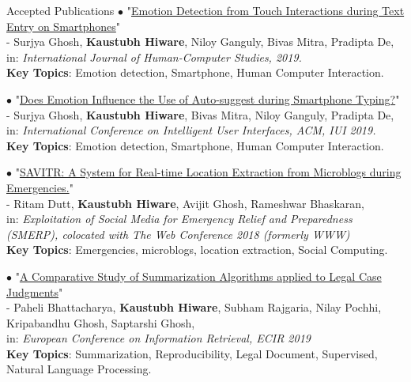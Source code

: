 \documentclass{resume} %
\begin{document}
\begin{rSection}{Accepted Publications}
$\bullet$ "\href{https://www.sciencedirect.com/science/article/abs/pii/S1071581918304889}{Emotion Detection from Touch Interactions during Text Entry on Smartphones}" \\
- Surjya Ghosh, \textbf{Kaustubh Hiware}, Niloy Ganguly, Bivas Mitra, Pradipta De,\\
in: \textit{International Journal of Human-Computer Studies, 2019.} \\
\textbf{\small Key Topics}: Emotion detection, Smartphone, Human Computer Interaction.

$\bullet$ "\href{https://dl.acm.org/authorize.cfm?key=N677554}{Does Emotion Influence the Use of Auto-suggest during Smartphone Typing?}" \\
- Surjya Ghosh, \textbf{Kaustubh Hiware}, Bivas Mitra, Niloy Ganguly, Pradipta De,\\
in: \textit{International Conference on Intelligent User Interfaces, ACM, IUI 2019.} \\
\textbf{\small Key Topics}: Emotion detection, Smartphone, Human Computer Interaction.

$\bullet$ "\href{https://www2018.thewebconf.org/proceedings/#wrk-131}{SAVITR: A System for Real-time Location Extraction from Microblogs during Emergencies.}" \\
- Ritam Dutt, \textbf{Kaustubh Hiware}, Avijit Ghosh, Rameshwar Bhaskaran, \\
in: \textit{Exploitation of Social Media for Emergency Relief and Preparedness (SMERP), colocated with The Web Conference 2018 (formerly WWW)}\\
\textbf{\small Key Topics}: Emergencies, microblogs, location extraction, Social Computing.

$\bullet$ "\href{https://ecir2019.org/accepted-papers/#reproducibilitypapers}{A Comparative Study of Summarization Algorithms applied to Legal Case Judgments}" \\
- Paheli Bhattacharya, \textbf{Kaustubh Hiware}, Subham Rajgaria, Nilay Pochhi, Kripabandhu Ghosh, Saptarshi Ghosh,\\
in: \textit{European Conference on Information Retrieval, ECIR 2019} \\
\textbf{\small Key Topics}: Summarization, Reproducibility, Legal Document, Supervised, Natural Language Processing.


\end{rSection}
\end{document}
